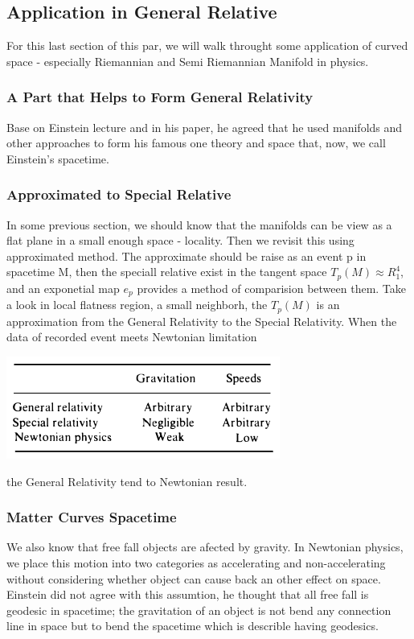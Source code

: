 \documentclass[11pt,a4paper]{article}
\begin{document}
	\subsection{Application in General Relative}
	For  this last section of this par, we will walk throught some application of curved space - especially Riemannian and Semi Riemannian Manifold in physics.
	\subsubsection{A Part that Helps to Form General Relativity}
	Base on Einstein lecture and in his paper, he agreed that he used manifolds and other approaches to form his famous one theory and space that, now, we call Einstein's spacetime.
	\subsubsection{Approximated to Special Relative} 
	In some previous section, we should know that the manifolds can be view as a flat plane in a small enough space - locality. Then we revisit this using approximated method. 
	The approximate should be raise as an event p in spacetime M, then the speciall relative exist in the tangent space $T_{p}(M) \approx R^4_1$, and  an exponetial map $e_p$ provides a method of comparision between them. Take a look in local flatness region, a small neighborh, the $T_{p}(M)$  is an approximation from the General Relativity to the Special Relativity. When the data of recorded event meets Newtonian limitation  
	\begin{center}
		\includegraphics[scale=0.5]{./neton_limit.png}
	\end{center}
	the General Relativity tend to  Newtonian result.
	\subsubsection{Matter Curves Spacetime}
	We also know that free fall objects are afected by gravity. In Newtonian physics, we place this motion into two categories as accelerating and non-accelerating without considering whether object can cause back an other effect on space. Einstein did not agree with this assumtion, he thought that all free fall is geodesic in spacetime; the gravitation of an object is not bend any connection line in space but to bend the spacetime which is describle having geodesics.
\end{document}
